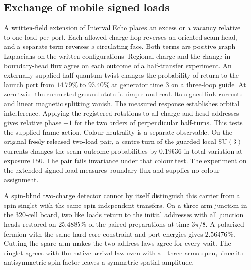 \subsection{Exchange of mobile signed loads}
\label{sec:cms-signed-exchange}

A written-field extension of Interval Echo places an excess or a vacancy
relative to one load per port. Each allowed charge hop reverses an oriented
seam head, and a separate term reverses a circulating face. Both terms
are positive graph Laplacians on the written configurations. Regional
charge and the change in boundary-head flux agree on each outcome of
a half-transfer experiment. An externally supplied half-quantum twist
changes the probability of return to the launch port from $14.79\%$ to
$93.40\%$ at generator time $3$ on a three-loop guide. At zero twist the
connected ground state is simple and real. Its signed link currents and linear magnetic splitting
vanish. The measured response establishes orbital interference.
Applying the registered rotations to all charge and head addresses
gives relative phase $+1$ for the two orders of perpendicular half-turns.
This tests the supplied frame action. Colour neutrality is a separate
observable. On the original freely released two-load pair, a centre turn
of the guarded local $\mathrm{SU}(3)$ currents changes the seam-outcome
probabilities by $0.19636$ in total variation at exposure 150. The pair
fails invariance under that colour test. The experiment on the extended
signed load measures boundary flux and supplies no colour assignment.

A spin-blind two-charge detector cannot by itself distinguish this
carrier from a spin singlet with the same spin-independent transfers.
On a three-arm junction in the 320-cell board, two like loads return
to the initial addresses with all junction heads restored on
$25.4885\%$ of the paired preparations at time $3\pi/8$. A polarized
fermion with the same hard-core constraint and port energies gives
$2.56476\%$. Cutting the spare arm makes the two address laws agree
for every wait. The singlet agrees with the native arrival law even
with all three arms open, since its antisymmetric spin factor leaves
a symmetric spatial amplitude.

